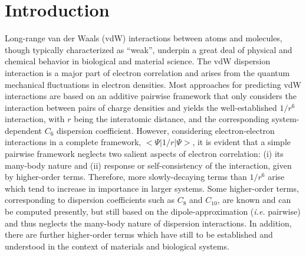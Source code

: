 \documentclass[aps,prl,groupaddress, twocolumn]{revtex4-1}  %
\begin{document}
\section*{Introduction}
Long-range van der Waals (vdW) interactions between atoms and molecules, though typically characterized as ``weak'', underpin a great deal of physical and chemical behavior in biological and material science. %
The vdW dispersion interaction is a major part of electron correlation and arises from the quantum mechanical fluctuations in electron densities. Most approaches for predicting vdW interactions are based on an additive pairwise framework that only considers the interaction between pairs of charge densities and yields the well-established $1/r^6$ interaction, with $r$ being the interatomic distance, and the corresponding system-dependent $C_6$ dispersion coefficient. However, considering electron-electron interactions in a complete framework, $<\Psi |1/r| \Psi>$, it is evident that a simple pairwise framework neglects two salient aspects of electron correlation: (i) its many-body nature and (ii) response or self-consistency of the interaction, given by higher-order terms.  Therefore, more slowly-decaying terms than $1/r^6$ arise which tend to increase in importance in larger systems. Some higher-order terms, corresponding to dispersion coefficients such as $C_8$ and $C_{10}$, are known and can be computed presently, but still based on the dipole-approximation (\textit{i.e.} pairwise) and thus neglects the many-body nature of dispersion interactions. In addition, there are further higher-order terms which have still to be established and understood in the context of materials and biological systems. 
\end{document}
